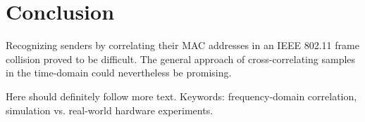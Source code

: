 
\chapter{Conclusion}\label{ch:Conclusion}
\glsresetall %

Recognizing senders by correlating their MAC addresses in an IEEE 802.11 frame collision proved to be difficult. The general approach of cross-correlating samples in the time-domain could nevertheless be promising.

Here should definitely follow more text. Keywords: frequency-domain correlation, simulation vs. real-world hardware experiments.
